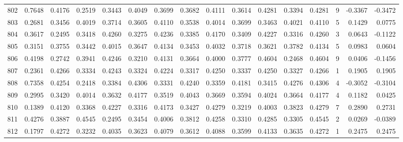 \begin{tabular}{lrrrrrrrrrrrrrrr}
802 &      0.7648 &  0.4176 &  0.2519 &  0.3443 &  0.4049 &  0.3699 &  0.3682 &  0.4111 &  0.3614 &  0.4281 &   0.3394 &     0.4281 &      9 &                   -0.3367 &                    -0.3472 \\
803 &      0.2681 &  0.3456 &  0.4019 &  0.3714 &  0.3605 &  0.4110 &  0.3538 &  0.4014 &  0.3699 &  0.3463 &   0.4021 &     0.4110 &      5 &                    0.1429 &                     0.0775 \\
804 &      0.3617 &  0.2495 &  0.3418 &  0.4260 &  0.3275 &  0.4236 &  0.3385 &  0.4170 &  0.3409 &  0.4227 &   0.3316 &     0.4260 &      3 &                    0.0643 &                    -0.1122 \\
805 &      0.3151 &  0.3755 &  0.3442 &  0.4015 &  0.3647 &  0.4134 &  0.3453 &  0.4032 &  0.3718 &  0.3621 &   0.3782 &     0.4134 &      5 &                    0.0983 &                     0.0604 \\
806 &      0.4198 &  0.2742 &  0.3941 &  0.4246 &  0.3210 &  0.4131 &  0.3664 &  0.4000 &  0.3777 &  0.4604 &   0.2468 &     0.4604 &      9 &                    0.0406 &                    -0.1456 \\
807 &      0.2361 &  0.4266 &  0.3334 &  0.4243 &  0.3324 &  0.4224 &  0.3317 &  0.4250 &  0.3337 &  0.4250 &   0.3327 &     0.4266 &      1 &                    0.1905 &                     0.1905 \\
808 &      0.7358 &  0.4254 &  0.2418 &  0.3384 &  0.4306 &  0.3331 &  0.4240 &  0.3359 &  0.4181 &  0.3415 &   0.4276 &     0.4306 &      4 &                   -0.3052 &                    -0.3104 \\
809 &      0.2995 &  0.3420 &  0.4014 &  0.3632 &  0.4177 &  0.3519 &  0.4043 &  0.3669 &  0.3594 &  0.4024 &   0.3664 &     0.4177 &      4 &                    0.1182 &                     0.0425 \\
810 &      0.1389 &  0.4120 &  0.3368 &  0.4227 &  0.3316 &  0.4173 &  0.3427 &  0.4279 &  0.3219 &  0.4003 &   0.3823 &     0.4279 &      7 &                    0.2890 &                     0.2731 \\
811 &      0.4276 &  0.3887 &  0.4545 &  0.2495 &  0.3454 &  0.4006 &  0.3812 &  0.4258 &  0.3310 &  0.4285 &   0.3305 &     0.4545 &      2 &                    0.0269 &                    -0.0389 \\
812 &      0.1797 &  0.4272 &  0.3232 &  0.4035 &  0.3623 &  0.4079 &  0.3612 &  0.4088 &  0.3599 &  0.4133 &   0.3635 &     0.4272 &      1 &                    0.2475 &                     0.2475 \\

\end{tabular}
